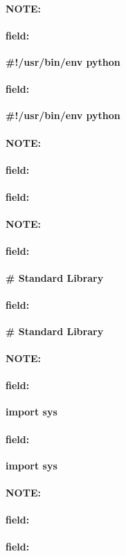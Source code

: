 \documentclass[12pt]{article}
\newenvironment{note}{\paragraph{NOTE:}}{}
\newenvironment{field}{\paragraph{field:}}{}
\begin{document}
\begin{note}
\begin{field}
\textbf{\large #!/usr/bin/env python}
\end{field}
\begin{field}
\textbf{\large #!/usr/bin/env python}
\begin{description}

\end{description}
\end{field}
\end{note}
\begin{note}
\begin{field}
\textbf{\large }
\end{field}
\begin{field}
\textbf{\large }
\begin{description}

\end{description}
\end{field}
\end{note}
\begin{note}
\begin{field}
\textbf{\large # Standard Library}
\end{field}
\begin{field}
\textbf{\large # Standard Library}
\begin{description}

\end{description}
\end{field}
\end{note}
\begin{note}
\begin{field}
\textbf{\large import sys}
\end{field}
\begin{field}
\textbf{\large import sys}
\begin{description}

\end{description}
\end{field}
\end{note}
\begin{note}
\begin{field}
\textbf{\large }
\end{field}
\begin{field}
\textbf{\large }
\begin{description}

\end{description}
\end{field}
\end{note}
\end{document}
